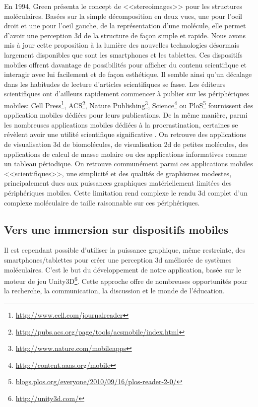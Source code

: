 En 1994, Green présenta le concept de <<stereoimages>> \cite{green_stereoimages_1994} pour les structures moléculaires. Basées sur la simple décomposition en deux vues, une pour l'oeil droit et une pour l'oeil gauche, de la représentation d'une molécule, elle permet d'avoir une perception 3d de la structure de façon simple et rapide. Nous avons mis à jour cette proposition à la lumière des nouvelles technologies désormais largement disponibles que sont les smartphones et les tablettes. Ces dispositifs mobiles offrent davantage de possibilités pour afficher du contenu scientifique et interagir avec lui facilement et de façon esthétique. Il semble ainsi qu'un décalage dans les habitudes de lecture d'articles scientifiques se fasse. Les éditeurs scientifiques ont d'ailleurs rapidement commencer à publier sur les périphériques mobiles: Cell Press\footnote{\url{http://www.cell.com/journalreader}}, ACS\footnote{\url{http://pubs.acs.org/page/tools/acsmobile/index.html}}, Nature Publishing\footnote{\url{http://www.nature.com/mobileapps}}, Science\footnote{\url{http://content.aaas.org/mobile}} ou PloS\footnote{\url{blogs.plos.org/everyone/2010/09/16/plos-reader-2-0/}} fournissent des application mobiles dédiées pour leurs publications. De la même manière, parmi les nombreuses applications mobiles dédiées à la procrastination, certaines se révèlent avoir une utilité scientifique significative \cite{powell_lab_2012}. On retrouve des applications de visualisation 3d de biomolécules, de visualisation 2d de petites molécules, des applications de calcul de masse molaire ou des applications informatives comme un tableau périodique. On retrouve communément parmi ces applications mobiles <<scientifiques>>, une simplicité et des qualités de graphismes modestes, principalement dues aux puissances graphiques matériellement limitées des périphériques mobiles. Cette limitation rend complexe le rendu 3d complet d'un complexe moléculaire de taille raisonnable sur ces périphériques.

\subsection{Vers une immersion sur dispositifs mobiles}

Il est cependant possible d'utiliser la puissance graphique, même restreinte, des smartphones/tablettes pour créer une perception 3d améliorée de systèmes moléculaires. C'est le but du développement de notre application, basée sur le moteur de jeu Unity3D\footnote{\url{http://unity3d.com/}}. Cette approche offre de nombreuses opportunités pour la recherche, la communication, la discussion et le monde de l'éducation.

